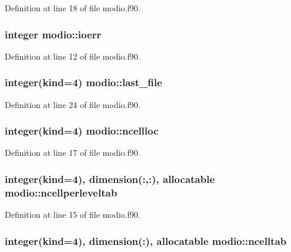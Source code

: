 Definition at line 18 of file modio.\-f90.

\hypertarget{classmodio_aea2235cb150c2f86e8564ce3d2e606a1}{
\subsubsection[{ioerr}]{\setlength{\rightskip}{0pt plus 5cm}integer modio\-::ioerr}}\label{classmodio_aea2235cb150c2f86e8564ce3d2e606a1}


Definition at line 12 of file modio.\-f90.

\hypertarget{classmodio_a3e203a61ede6084d5dd96d438500b155}{
\subsubsection[{last\-\_\-file}]{\setlength{\rightskip}{0pt plus 5cm}integer(kind=4) modio\-::last\-\_\-file}}\label{classmodio_a3e203a61ede6084d5dd96d438500b155}


Definition at line 24 of file modio.\-f90.

\hypertarget{classmodio_a1c862995bd67ce8f4a3305dad6022064}{
\subsubsection[{ncellloc}]{\setlength{\rightskip}{0pt plus 5cm}integer(kind=4) modio\-::ncellloc}}\label{classmodio_a1c862995bd67ce8f4a3305dad6022064}


Definition at line 17 of file modio.\-f90.

\hypertarget{classmodio_a541838a88faeed3af974f875bd73ee00}{
\subsubsection[{ncellperleveltab}]{\setlength{\rightskip}{0pt plus 5cm}integer(kind=4), dimension(\-:,\-:), allocatable modio\-::ncellperleveltab}}\label{classmodio_a541838a88faeed3af974f875bd73ee00}


Definition at line 15 of file modio.\-f90.

\hypertarget{classmodio_a0a0852674d63f2d9f6c23969d3f7016c}{
\subsubsection[{ncelltab}]{\setlength{\rightskip}{0pt plus 5cm}integer(kind=4), dimension(\-:), allocatable modio\-::ncelltab}}\label{classmodio_a0a0852674d63f2d9f6c23969d3f7016c}


